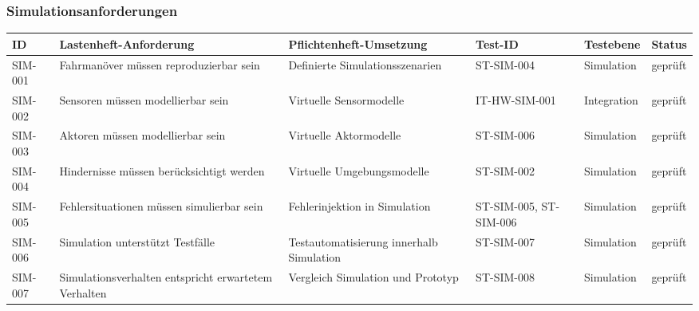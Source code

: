 \subsubsection{Simulationsanforderungen}\label{simulationsanforderungen}

\begin{longtable}[]{@{}
  >{\raggedright\arraybackslash}p{}
  >{\raggedright\arraybackslash}p{}
  >{\raggedright\arraybackslash}p{}
  >{\raggedright\arraybackslash}p{}
  >{\raggedright\arraybackslash}p{}
  >{\raggedright\arraybackslash}p{}@{}}
\toprule\noalign{}
\begin{minipage}[b]{\linewidth}\raggedright
ID
\end{minipage} & \begin{minipage}[b]{\linewidth}\raggedright
Lastenheft-Anforderung
\end{minipage} & \begin{minipage}[b]{\linewidth}\raggedright
Pflichtenheft-Umsetzung
\end{minipage} & \begin{minipage}[b]{\linewidth}\raggedright
Test-ID
\end{minipage} & \begin{minipage}[b]{\linewidth}\raggedright
Testebene
\end{minipage} & \begin{minipage}[b]{\linewidth}\raggedright
Status
\end{minipage} \\
\midrule\noalign{}
\endhead
\bottomrule\noalign{}
\endlastfoot
SIM-001 & Fahrmanöver müssen reproduzierbar sein & Definierte
Simulationsszenarien & ST-SIM-004 & Simulation & geprüft \\
SIM-002 & Sensoren müssen modellierbar sein & Virtuelle Sensormodelle &
IT-HW-SIM-001 & Integration & geprüft \\
SIM-003 & Aktoren müssen modellierbar sein & Virtuelle Aktormodelle &
ST-SIM-006 & Simulation & geprüft \\
SIM-004 & Hindernisse müssen berücksichtigt werden & Virtuelle
Umgebungsmodelle & ST-SIM-002 & Simulation & geprüft \\
SIM-005 & Fehlersituationen müssen simulierbar sein & Fehlerinjektion in
Simulation & ST-SIM-005, ST-SIM-006 & Simulation & geprüft \\
SIM-006 & Simulation unterstützt Testfälle & Testautomatisierung
innerhalb Simulation & ST-SIM-007 & Simulation & geprüft \\
SIM-007 & Simulationsverhalten entspricht erwartetem Verhalten &
Vergleich Simulation und Prototyp & ST-SIM-008 & Simulation & geprüft \\
\end{longtable}

